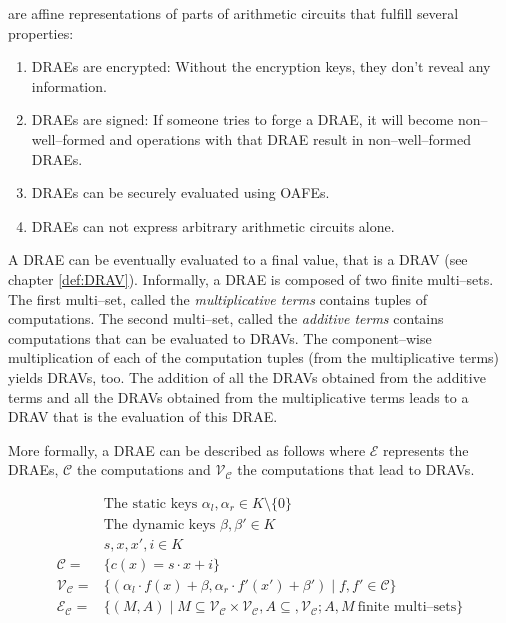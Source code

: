%
%
\label{sec:drae}

 are affine representations of
parts of arithmetic circuits that fulfill several properties:

\begin{enumerate}

  \item \label{prop:drae-encrypted} DRAEs are encrypted: Without the encryption
    keys, they don't reveal any information.

  \item \label{prop:drae-signed} DRAEs are signed: If someone tries to forge a
    DRAE, it will become non--well--formed and operations with that DRAE result
    in non--well--formed DRAEs.

  \item \label{prop:drae-oafe} DRAEs can be securely evaluated using OAFEs.

  \item \label{prop:drae-not-enough} DRAEs can not express arbitrary arithmetic
    circuits alone.

\end{enumerate}

\noindent{}A DRAE can be eventually evaluated to a final value, that is a DRAV
(see chapter \ref{def:DRAV}). Informally, a DRAE is composed of two finite
multi--sets. The first multi--set, called the \emph{multiplicative terms}
contains tuples of computations. The second multi--set, called the
\emph{additive terms} contains computations that can be evaluated to DRAVs. The
component--wise multiplication of each of the computation tuples (from the
multiplicative terms) yields DRAVs, too. The addition of all the DRAVs obtained
from the additive terms and all the DRAVs obtained from the multiplicative terms
leads to a DRAV that is the evaluation of this DRAE.

More formally, a DRAE can be described as follows where $\mathcal{E}$ represents
the DRAEs, $\mathcal{C}$ the computations and $\mathcal{V}_\mathcal{C}$ the
computations that lead to DRAVs.

\begin{align}
%
  &\text{The static keys } \alpha_l, \alpha_r \in K \setminus \{0\} \nonumber\\
%
  &\text{The dynamic keys } \beta, \beta' \in K \nonumber\\
%
  &s, x, x', i \in K \nonumber\\
%
  \mathcal{C} = & \{ c(x) = s \cdot x + i \} \nonumber\\
%
  \mathcal{V}_\mathcal{C} = & \{ (\alpha_l \cdot f(x) + \beta,
                      \alpha_r \cdot f'(x') + \beta' )
                    \mid f, f' \in \mathcal{C} \} \nonumber\\
%
  \label{rel:DRAE}
  \mathcal{E}_\mathcal{C} = & \{ (M, A) \mid
      M \subseteq \mathcal{V}_\mathcal{C} \times
      \mathcal{V}_\mathcal{C}, A \subseteq, \mathcal{V}_\mathcal{C};
  A, M~\text{finite multi--sets} \}
%
\end{align}

